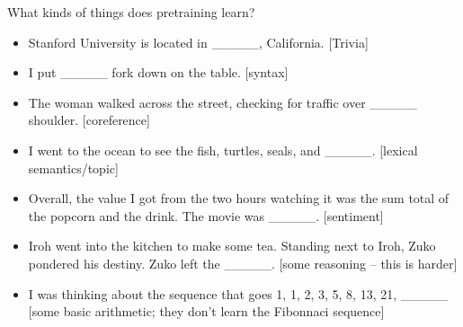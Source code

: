 \documentclass[handout]{beamer}
\begin{document}
\begin{frame}{What kinds of things does pretraining learn?}


\begin{scriptsize}
\begin{itemize}
\item Stanford University is located in \_\_\_\_\_, California. [Trivia]
\item I put \_\_\_\_\_ fork down on the table. [syntax]
\item The woman walked across the street, checking for traffic over \_\_\_\_\_ shoulder. [coreference]
 \item I went to the ocean to see the fish, turtles, seals, and \_\_\_\_\_. [lexical semantics/topic]
\item Overall, the value I got from the two hours watching it was the sum total of the popcorn and the drink. The movie was \_\_\_\_\_. [sentiment]
\item Iroh went into the kitchen to make some tea. Standing next to Iroh, Zuko pondered his destiny. Zuko left the \_\_\_\_\_. [some reasoning – this is harder]
\item I was thinking about the sequence that goes 1, 1, 2, 3, 5, 8, 13, 21, \_\_\_\_\_ [some basic arithmetic; they don’t learn the Fibonnaci sequence]
\end{itemize}


\end{scriptsize}

\end{frame}
\end{document}

